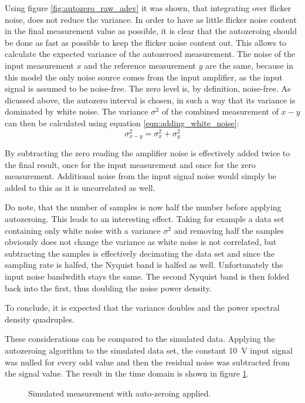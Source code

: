 Using figure \ref{fig:autozero_raw_adev} it was shown, that integrating over flicker noise, does not reduce the variance. In order to have as little flicker noise content in the final measurement value as possible, it is clear that the autozeroing should be done as fast as possible to keep the flicker noise content out. This allows to calculate the expected variance of the autozeroed measurement. The noise of the input measurement $x$ and the reference measurement $y$ are the same, because in this model the only noise source comes from the input amplifier, as the input signal is assumed to be noise-free. The zero level is, by definition, noise-free. As dicussed above, the autozero interval is chosen, in such a way that its variance is dominated by white noise. The variance $\sigma^2$ of the combined measurement of $x-y$ can then be calculated using equation \ref{eqn:adding_white_noise}:
\begin{equation}
    \sigma_{x-y}^2 = \sigma_x^2 + \sigma_y^2 \label{eqn:autozeroing}
\end{equation}

By subtracting the zero reading the amplifier noise is effectively added twice to the final result, once for the input measurement and once for the zero measurement. Additional noise from the input signal noise would simply be added to this as it is uncorrelated as well.

Do note, that the number of samples is now half the number before applying autozeroing. This leads to an interesting effect. Taking for example a data set containing only white noise with a variance $\sigma^2$ and removing half the samples obviously does not change the variance as white noise is not correlated, but subtracting the samples is effectively decimating the data set and since the sampling rate is halfed, the Nyquist band is halfed as well. Unfortunately the input noise bandwdith stays the same. The second Nyquist band is then folded back into the first, thus doubling the noise power density.

To conclude, it is expected that the variance doubles and the power spectral density quadruples.

These considerations can be compared to the simulated data. Applying the autozeroing algorithm to the simulated data set, the constant \qty{10}{\V} input signal was nulled for every odd value and then the residual noise was subtracted from the signal value. The result in the time domain is shown in figure \ref{fig:autozero_time}.

\begin{figure}[hb]
    \centering
    
    \caption{Simulated measurement with auto-zeroing applied.}
    \label{fig:autozero_time}
\end{figure}

